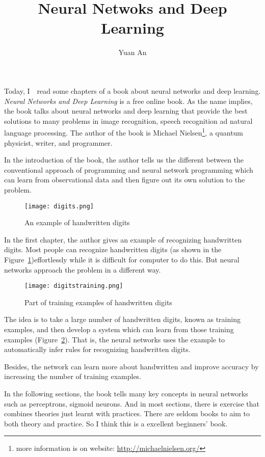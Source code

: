 \documentclass[a4paper,12pt,twocolumn]{article}
\title{Neural Netwoks and Deep Learning}
\author{Yuan An}
\begin{document}
\maketitle
Today, I　read some chapters of a book about neural networks and deep learning. \emph{Neural Networks and Deep Learning}\cite{NNDL} is a free online book. As the name implies, the book talks about neural networks and deep learning that provide the best solutions to many problems in image recognition, speech recognition ad natural language processing. The author of the book is Michael Nielsen\footnote{more information is on website: \url{http://michaelnielsen.org/}}, a quantum physicist, writer, and programmer.
\par
In the introduction of the book, the author tells us the different between the conventional approach of programming and neural network programming which can learn from observational data and then figure out its own solution to the problem.
\par
\begin{figure}[h]
	\centering
	\texttt{[image: digits.png]}
	\caption{An example of handwritten digits}\label{fig1}
\end{figure}
In the first chapter, the author gives an example of recognizing handwritten digits. Most people can recognize handwritten digits (as shown in the Figure~\ref{fig1})effortlessly while it is difficult for computer to do this. But neural networks approach the problem in a different way. 
\par
\begin{figure}[h]
	\centering
	\texttt{[image: digitstraining.png]}
	\caption{Part of training examples of handwritten digits}\label{fig2}
\end{figure}
The idea is to take a large number of handwritten digits, known  as training examples, and then develop a system which can learn from those training examples (Figure~\ref{fig2}). That is, the neural networks uses the example to automatically infer rules for recognizing handwritten digits.
\par
Besides, the network can learn more about handwritten and improve accuracy by increasing the number of training examples.
\par
In the following sections, the book tells many key concepts in neural networks such as perceptrons, sigmoid neurons. And in most sections, there is exercise that combines theories just learnt with practices. There are seldom books to aim to both theory and practice. So I think this is a excellent beginners' book.


\end{document}
